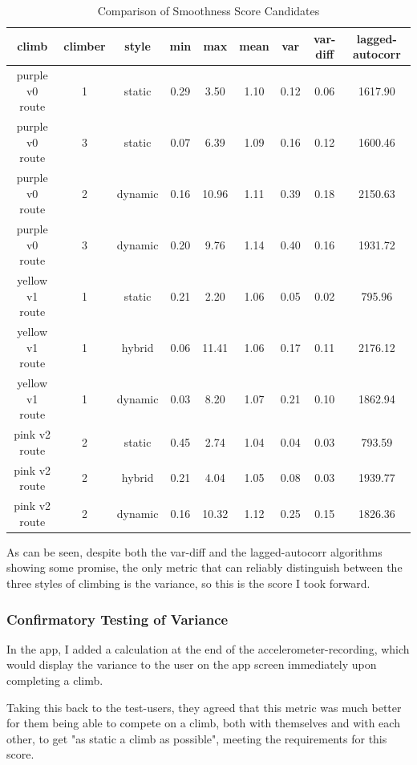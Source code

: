\begin{table}[h]
\centering
\begin{tabular}{|c|c|c|c|c|c|c|c|c|}
\hline
climb  &  climber & style & min & max & mean & var & var-diff & lagged-autocorr \\ \hline
purple v0 route & 1 & static  & 0.29 & 3.50 & 1.10 & 0.12 & 0.06 & 1617.90 \\ \hline
purple v0 route & 3 & static  & 0.07 & 6.39 & 1.09 & 0.16 & 0.12 & 1600.46 \\ \hline
purple v0 route & 2 & dynamic & 0.16 & 10.96 & 1.11 & 0.39 & 0.18 & 2150.63 \\ \hline
purple v0 route & 3 & dynamic & 0.20 & 9.76 & 1.14 & 0.40 & 0.16 & 1931.72 \\ \hline
yellow v1 route & 1 & static  & 0.21 & 2.20 & 1.06 & 0.05 & 0.02 & 795.96 \\ \hline
yellow v1 route & 1 & hybrid & 0.06 & 11.41 & 1.06 & 0.17 & 0.11 & 2176.12 \\ \hline
yellow v1 route & 1 & dynamic & 0.03 & 8.20 & 1.07 & 0.21 & 0.10 & 1862.94 \\ \hline
pink v2 route & 2 & static & 0.45 & 2.74 & 1.04 & 0.04 & 0.03 & 793.59 \\ \hline
pink v2 route & 2 & hybrid & 0.21 & 4.04 & 1.05 & 0.08 & 0.03 & 1939.77 \\ \hline
pink v2 route & 2 & dynamic & 0.16 & 10.32 & 1.12 & 0.25 & 0.15 & 1826.36 \\ \hline

\end{tabular}
\caption{Comparison of Smoothness Score Candidates}
\label{tab:smoothnesses}
\end{table}

As can be seen, despite both the var-diff and the lagged-autocorr algorithms showing some promise, the only metric that can reliably distinguish between the three styles of climbing is the variance, so this is the score I took forward.

\subsubsection{Confirmatory Testing of Variance}
In the app, I added a calculation at the end of the accelerometer-recording, which would display the variance to the user on the app screen immediately upon completing a climb.

Taking this back to the test-users, they agreed that this metric was much better for them being able to compete on a climb, both with themselves and with each other, to get "as static a climb as possible", meeting the requirements for this score.

